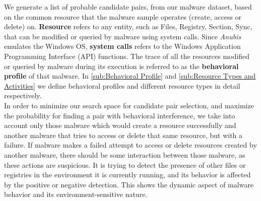 We generate a list of probable candidate pairs, from our malware dataset, based on the common resource that the malware sample operates (create, access or delete) on.
\textbf{Resource} refers to any entity, such as Files, Registry, Section, Sync, that can be modified or queried by malware using system calls.
Since \emph{Anubis} emulates the Windows OS, \textbf{system calls} refers to the Windows Application Programming Interface (API) functions.
The trace of all the resources modified or queried by malware during its execution is referred to as the \textbf{behavioral profile} of that malware.
In \autoref{sub:Behavioral Profile} and \autoref{sub:Resource Types and Activities} we define behavioral profiles and different resource types in detail respectively.\\

In order to minimize our search space for candidate pair selection, and maximize the probability for finding a pair with behavioral interference, we take into account only those malware which would create a resource successfully and another malware that tries to access or delete that same resource, but with a failure.
If malware makes a failed attempt to access or delete resources created by another malware, there should be some interaction between those malware, as these actions are suspicious.
It is trying to detect the presence of other files or registries in the environment it is currently running, and its behavior is affected by the positive or negative detection.
This shows the dynamic aspect of malware behavior and its environment-sensitive nature.\\

